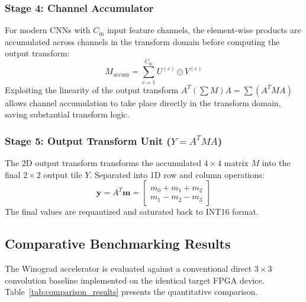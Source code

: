 \documentclass[12pt,a4paper]{article}
\begin{document}
\subsubsection{Stage 4: Channel Accumulator}
For modern CNNs with $C_{\text{in}}$ input feature channels, the element-wise products are accumulated across channels in the transform domain before computing the output transform:
\begin{equation}
    M_{\text{accum}} = \sum_{c=1}^{C_{\text{in}}} U^{(c)} \odot V^{(c)}
\end{equation}
Exploiting the linearity of the output transform $A^T (\sum M) A = \sum (A^T M A)$ allows channel accumulation to take place directly in the transform domain, saving substantial transform logic.

\subsubsection{Stage 5: Output Transform Unit ($Y = A^T M A$)}
The 2D output transform transforms the accumulated $4 \times 4$ matrix $M$ into the final $2 \times 2$ output tile $Y$. Separated into 1D row and column operations:
\begin{equation}
    \mathbf{y} = A^T \mathbf{m} = \begin{bmatrix}
        m_0 + m_1 + m_2 \\
        m_1 - m_2 - m_3
    \end{bmatrix}
\end{equation}
The final values are requantized and saturated back to INT16 format.

\subsection{Comparative Benchmarking Results}
The Winograd accelerator is evaluated against a conventional direct $3 \times 3$ convolution baseline implemented on the identical target FPGA device. Table~\ref{tab:comparison_results} presents the quantitative comparison.
\end{document}
